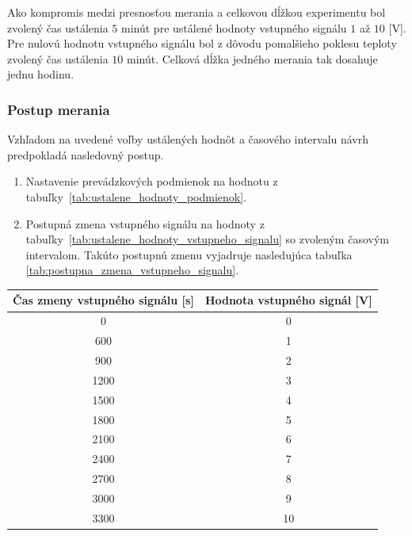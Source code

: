 \documentclass[a4paper, 10pt, ]{article}
\begin{document}
Ako kompromis medzi presnosťou merania a celkovou dĺžkou experimentu bol zvolený čas ustálenia $5$ minút pre ustálené hodnoty vstupného signálu $1$ až $10$ [V]. Pre nulovú hodnotu vstupného signálu bol z dôvodu pomalšieho poklesu teploty zvolený čas ustálenia $10$ minút. Celková dĺžka jedného merania tak dosahuje jednu hodinu.



\subsubsection{Postup merania}

Vzhľadom na uvedené voľby ustálených hodnôt a časového intervalu návrh predpokladá nasledovný postup.

\begin{enumerate}[leftmargin=0pt, labelsep=4mm, itemsep=0pt]
    \item Nastavenie prevádzkových podmienok na hodnotu z tabuľky~\ref{tab:ustalene_hodnoty_podmienok}.
    \item Postupná zmena vstupného signálu na hodnoty z tabuľky~\ref{tab:ustalene_hodnoty_vstupneho_signalu} so zvoleným časovým intervalom. Takúto postupnú zmenu vyjadruje nasledujúca tabuľka \ref{tab:postupna_zmena_vstupneho_signalu}.
    
\end{enumerate}


\begin{center}

\vspace{-10pt}    

\label{tab:postupna_zmena_vstupneho_signalu}

\lstyle

\begin{tabular*}{\textwidth}{@{ \extracolsep{\fill}} cc}
\toprule
Čas zmeny vstupného signálu [s] & Hodnota vstupného signál [V] \\
\midrule
0 & 0 \\
600 & 1 \\
900 & 2 \\
1200 & 3 \\
1500 & 4 \\
1800 & 5 \\
2100 & 6 \\
2400 & 7 \\
2700 & 8 \\
3000 & 9 \\
3300 & 10 \\
\bottomrule
\end{tabular*}

\end{center}
\end{document}
